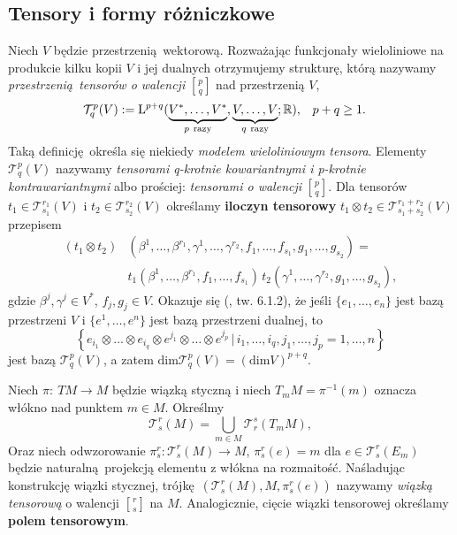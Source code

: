 \subsection{Tensory i formy różniczkowe}
Niech \(V\) będzie przestrzenią wektorową. Rozważając funkcjonały wieloliniowe na produkcie kilku kopii \(V\) i jej dualnych otrzymujemy strukturę, którą nazywamy \emph{przestrzenią tensorów o walencji} \({p \brack q}\) nad przestrzenią \(V\),
\begin{align*}
    \mathcal{T}_q^p(V) := \mathrm{L}^{p+q}(\underbrace{V^\ast, \dots, V^\ast}_{p\ \text{razy}} ,\underbrace{V,\dots, V}_{q\ \text{razy}}; \mathbb{R}) , &\quad p+q\geq 1.
\end{align*}
Taką definicję określa się niekiedy \emph{modelem wieloliniowym tensora}. Elementy \(\mathcal{T}_q^p(V)\) nazywamy \emph{tensorami q-krotnie kowariantnymi i p-krotnie kontrawariantnymi} albo prościej: \emph{tensorami o walencji} \(p \brack q\). Dla tensorów \(t_1 \in \mathcal{T}_{s_1}^{r_1}(V)\) i \(t_2 \in \mathcal{T}_{s_2}^{r_2}(V)\) określamy \textbf{iloczyn tensorowy} \(t_1 \otimes t_2 \in \mathcal{T}_{s_1+s_2}^{r_1+r_2}(V)\) przepisem
\begin{align*}
    (t_1 \otimes t_2)& (\beta^1,\dots, \beta^{r_1}, \gamma^1, \dots, \gamma^{r_2}, f_1, \dots, f_{s_1}, g_1, \dots, g_{s_2}) = \\
                     & t_1(\beta^1,\dots, \beta^{r_1}, f_1, \dots, f_{s_1})\,t_2(\gamma^1, \dots, \gamma^{r_2},g_1, \dots, g_{s_2}),
\end{align*}
gdzie \(\beta^j, \gamma^j \in V^\ast\), \(f_j, g_j\in V\).
Okazuje się (\cite{marsden}, tw. 6.1.2), że jeśli \(\{e_1, \dots, e_n\}\) jest bazą przestrzeni \(V\) i \(\{e^1, \dots, e^n\}\) jest bazą przestrzeni dualnej, to
\begin{equation*}
    \left\{e_{i_1} \otimes \dots \otimes e_{i_q} \otimes e^{j_1} \otimes \dots \otimes e^{j_p} \, | \, i_1, \dots, i_q, j_1, \dots, j_p = 1, \dots, n \right\}
\end{equation*}
jest bazą \(\mathcal{T}_q^p(V)\), a zatem \(\mathrm{dim}\mathcal{T}_q^p(V) = (\mathrm{dim}V)^{p+q}\).

Niech \(\pi:\:TM\to M\) będzie wiązką styczną i niech \(T_m M = \pi^{-1}(m)\) oznacza włókno nad punktem \(m\in M\). Określmy
\begin{equation*}
    \mathcal{T}_s^r(M)=\bigcup\limits_{m\in M} \mathcal{T}_r^s(T_m M),
\end{equation*}
Oraz niech odwzorowanie \(\pi_s^r:\mathcal{T}_s^r(M)\to M\), \(\pi_s^r(e) = m\) dla \(e\in \mathcal{T}_s^r(E_m)\) będzie naturalną projekcją elementu z włókna na rozmaitość. Naśladując konstrukcję wiązki stycznej, trójkę \((\mathcal{T}_s^r(M), M, \pi_s^r(e))\) nazywamy \emph{wiązką tensorową} o walencji \(r \brack s\) na \(M\). Analogicznie, cięcie wiązki tensorowej określamy \textbf{polem tensorowym}.

